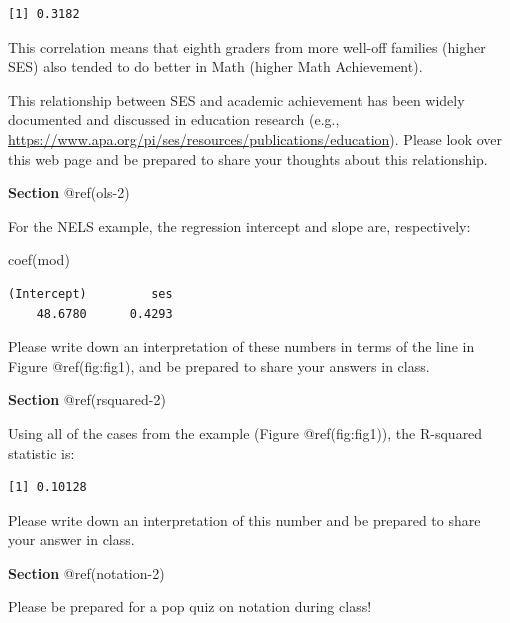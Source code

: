 \documentclass[
  letterpaper,
  DIV=11,
  numbers=noendperiod]{scrreprt}
\newenvironment{Shaded}{\begin{snugshade}}{\end{snugshade}}
\newcommand{\AttributeTok}[1]{\textcolor[rgb]{0.40,0.45,0.13}{#1}}
\newcommand{\DecValTok}[1]{\textcolor[rgb]{0.68,0.00,0.00}{#1}}
\newcommand{\FunctionTok}[1]{\textcolor[rgb]{0.28,0.35,0.67}{#1}}
\newcommand{\NormalTok}[1]{\textcolor[rgb]{0.00,0.23,0.31}{#1}}
\newcommand{\SpecialCharTok}[1]{\textcolor[rgb]{0.37,0.37,0.37}{#1}}
\begin{document}
\begin{verbatim}
[1] 0.3182
\end{verbatim}

This correlation means that eighth graders from more well-off families
(higher SES) also tended to do better in Math (higher Math Achievement).

This relationship between SES and academic achievement has been widely
documented and discussed in education research (e.g.,
\url{https://www.apa.org/pi/ses/resources/publications/education}).
Please look over this web page and be prepared to share your thoughts
about this relationship.

\textbf{Section} @ref(ols-2)

For the NELS example, the regression intercept and slope are,
respectively:

\begin{Shaded}
\begin{Highlighting}[]
\FunctionTok{coef}\NormalTok{(mod)}
\end{Highlighting}
\end{Shaded}

\begin{verbatim}
(Intercept)         ses 
    48.6780      0.4293 
\end{verbatim}

Please write down an interpretation of these numbers in terms of the
line in Figure @ref(fig:fig1), and be prepared to share your answers in
class.

\textbf{Section} @ref(rsquared-2)

Using all of the cases from the example (Figure @ref(fig:fig1)), the
R-squared statistic is:

\begin{Shaded}
\end{Shaded}

\begin{verbatim}
[1] 0.10128
\end{verbatim}

Please write down an interpretation of this number and be prepared to
share your answer in class.

\textbf{Section} @ref(notation-2)

Please be prepared for a pop quiz on notation during class!
\end{document}
